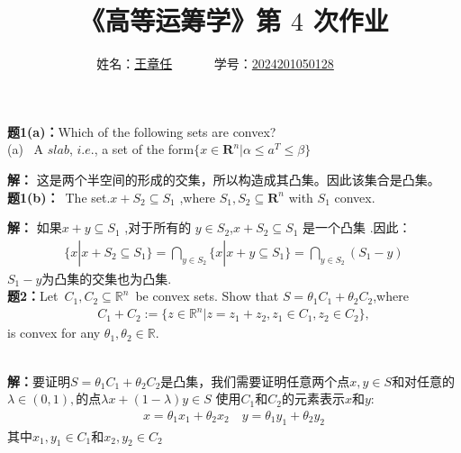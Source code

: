 \documentclass[12pt,a4paper]{article}
\begin{document}
\title{
{\heiti《高等运筹学》第 {$4$} 次作业
}
}
\date{}

\author{
	姓名：\underline{王章任}~~~~~~
	学号：\underline{2024201050128}~~~~~~}

\maketitle

\noindent
{\bf 题1(a)：}Which of the following sets are convex?\\
(a)~ A $slab$, $i.e.$, a set of the form$\{x \in \mathbf{R}^n| \alpha \leq a^T \le \beta\}$

\vspace{5pt}
\noindent
{\bf 解：}
这是两个半空间的形成的交集，所以构造成其凸集。因此该集合是凸集。\\

\vspace{5pt}
\noindent
{\bf 题1(b)：}~The set.$x+S_2 \subseteq S_1 $ ,where  $S_1,S_2 \subseteq\mathbf{R}^n $ with $S_1$ convex.

\vspace{5pt}
\noindent
{\bf 解：}
如果$x+y \subseteq S_1 $ ,对于所有的 $y \in S_2$,$x+S_2 \subseteq S_1$ 是一个凸集 .因此：
\begin{align*}
	\{x|x+S_2 \subseteq S_{1}\}=\bigcap_{y \in S_2}\{x|x+y \subseteq S_{1}\}=\bigcap_{y \in S_2} (S_{1}-y)
\end{align*}
$S_1-y$为凸集的交集也为凸集.\\

\vspace{5pt}
\noindent
{\bf 题2：}Let~$C_1,C_2 \subseteq \mathbb{R}^n $~be convex sets. Show that $S=\theta_1C_1+\theta_2C_2$,where
\begin{align*}
	C_1+C_2:=\{z\in\mathbb{R}^n|z=z_1+z_2,z_1\in C_1,z_2\in C_2\},
\end{align*}
is convex for any \(\theta_1,\theta_2 \in \mathbb{R}\).

\vspace{5pt}
\noindent \\
{\bf 解：}要证明$S=\theta_1C_1+\theta_2C_2$是凸集，我们需要证明任意两个点\(x,y \in S\)和对任意的\(\lambda \in (0,1),\)的点\(\lambda x+(1-\lambda)y \in S\)
使用\(C_1\)和\(C_2\)的元素表示\(x\)和\(y\):
\begin{align*}
	x=\theta_1 x_1+\theta_2 x_2 \quad y=\theta_1 y_1+\theta_2 y_2
\end{align*}
其中\(x_1,y_1 \in C_1 \)和\(x_2,y_2 \in C_2\)
\end{document}
